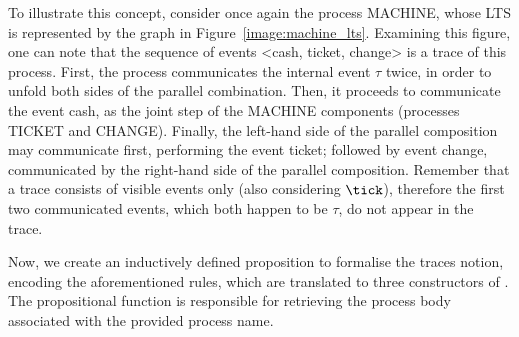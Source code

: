 To illustrate this concept, consider once again the process MACHINE, whose LTS is represented by the graph in Figure~\ref{image:machine_lts}. Examining this figure, one can note that the sequence of events <cash, ticket, change> is a trace of this process. First, the process communicates the internal event $ \tau $ twice, in order to unfold both sides of the parallel combination. Then, it proceeds to communicate the event cash, as the joint step of the MACHINE components (processes TICKET and CHANGE). Finally, the left-hand side of the parallel composition may communicate first, performing the event ticket; followed by event change, communicated by the right-hand side of the parallel composition. Remember that a trace consists of visible events only (also considering $\tick$), therefore the first two communicated events, which both happen to be $ \tau $, do not appear in the trace.

Now, we create an inductively defined proposition to formalise the traces notion, encoding the aforementioned rules, which are translated to three constructors of . The propositional function  is responsible for retrieving the process body associated with the provided process name.

